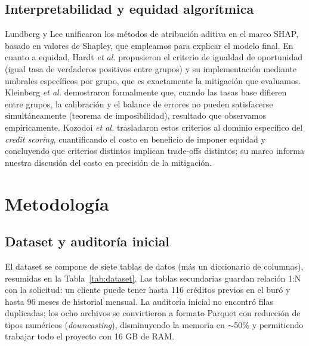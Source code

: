 \documentclass[journal]{IEEEtran}
\begin{document}
\subsection{Interpretabilidad y equidad algorítmica}

Lundberg y Lee \cite{lundberg2017} unificaron los métodos de atribución aditiva en el marco SHAP, basado en valores de Shapley, que empleamos para explicar el modelo final. En cuanto a equidad, Hardt \textit{et al.} \cite{hardt2016} propusieron el criterio de igualdad de oportunidad (igual tasa de verdaderos positivos entre grupos) y su implementación mediante umbrales específicos por grupo, que es exactamente la mitigación que evaluamos. Kleinberg \textit{et al.} \cite{kleinberg2017} demostraron formalmente que, cuando las tasas base difieren entre grupos, la calibración y el balance de errores no pueden satisfacerse simultáneamente (teorema de imposibilidad), resultado que observamos empíricamente. Kozodoi \textit{et al.} \cite{kozodoi2022} trasladaron estos criterios al dominio específico del \textit{credit scoring}, cuantificando el costo en beneficio de imponer equidad y concluyendo que criterios distintos implican trade-offs distintos; su marco informa nuestra discusión del costo en precisión de la mitigación.

\section{Metodología}

\subsection{Dataset y auditoría inicial}

El dataset se compone de siete tablas de datos (más un diccionario de columnas), resumidas en la Tabla~\ref{tab:dataset}. Las tablas secundarias guardan relación 1:N con la solicitud: un cliente puede tener hasta 116 créditos previos en el buró y hasta 96 meses de historial mensual. La auditoría inicial no encontró filas duplicadas; los ocho archivos se convirtieron a formato Parquet con reducción de tipos numéricos (\textit{downcasting}), disminuyendo la memoria en $\sim$50\% y permitiendo trabajar todo el proyecto con 16 GB de RAM.
\end{document}
